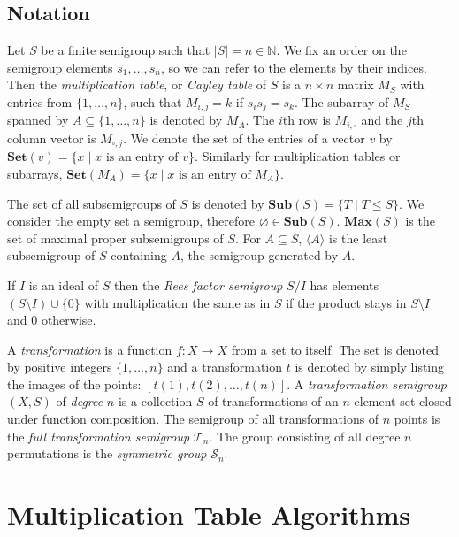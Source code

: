 \documentclass{amsart}
\newcommand{\cT}{{\mathcal T}}
\newcommand{\cS}{{\mathcal S}}
\newcommand{\Sub}{\mathbf{Sub}}
\newcommand{\Set}{\mathbf{Set}}
\newcommand{\Pos}{\mathbf{Pos}}
\newcommand{\Max}{\mathbf{Max}}
\theoremstyle{plain}
\theoremstyle{definition}
\begin{document}
\subsection{Notation}

Let $S$ be a finite semigroup such that $|S|=n\in\mathbb{N}$.
We fix an order on the semigroup elements $s_1,\ldots, s_n$, so we can refer to the elements by their indices. 
Then the  \emph{multiplication table}, or \emph{Cayley table} of $S$ is a $n\times n$ matrix $M_S$ with entries from
$\{1,\ldots,n\}$, such that $M_{i,j}=k$ if $s_is_j=s_k$.
The subarray of $M_S$ spanned by $A\subseteq\{1,\ldots,n\}$ is denoted by $M_A$.
The $i$th row is $M_{i,\square}$  and the $j$th column vector is $M_{\square,j}$.
We denote the set of the entries of a vector $v$ by $\Set(v)=\{x\mid x\text{ is
an entry of } v\}$.  Similarly for multiplication tables or subarrays,
$\Set(M_A)=\{x\mid x\text{ is an entry of } M_A\}$.  %

The set of all subsemigroups of $S$ is denoted by $\Sub(S)=\big\{T\mid T\leq S
\big\}$.  We consider the empty set a semigroup, therefore
$\varnothing\in\Sub(S)$.  $\Max(S)$ is the set of maximal proper subsemigroups
of $S$.  For $A\subseteq S$, $\langle A\rangle$ is the least subsemigroup of $S$
containing $A$, the semigroup generated by $A$. 

If $I$ is an ideal of $S$ then the \emph{Rees factor semigroup} $S/I$ has
elements $(S\setminus I)\cup\{0\}$ with multiplication the same as in $S$ if the
product stays in $S\setminus I$ and 0 otherwise.

A \emph{transformation} is a function $f:X\rightarrow X$ from a set to itself.
The set is denoted by positive integers $\{1,\ldots,n\}$ and a transformation $t$ is denoted by simply listing the images of the points: $[t(1),t(2),\ldots,t(n)]$. 
A \emph{transformation semigroup} $(X,S)$ of \emph{degree} $n$ is a collection $S$ of transformations of an $n$-element set closed under function composition. 
The semigroup of all  transformations of $n$ points is the  \emph{full transformation semigroup} $\cT_n$.
The group  consisting of all degree $n$ permutations is the \emph{symmetric group} $\cS_n$.

\section{Multiplication Table Algorithms}
\label{sec:multab}
\end{document}
